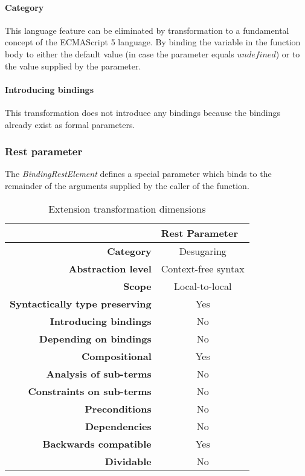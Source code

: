 \paragraph{Category}
This language feature can be eliminated by transformation to a fundamental concept of the ECMAScript 5 language. By binding the variable in the function body to either the default value (in case the parameter equals $undefined$) or to the value supplied by the parameter.

\paragraph{Introducing bindings}
This transformation does not introduce any bindings because the bindings already exist as formal parameters.

\subsubsection{Rest parameter}
The \textit{BindingRestElement} defines a special parameter which binds to the remainder of the arguments supplied by the caller of the function.\cite[14.1]{SpecJS}

\begin{table}[h]
\centering
\caption{Extension transformation dimensions}
\label{rest-parameter-table}
\begin{tabular}{@{}rc@{}}
\toprule
                                       & \multicolumn{1}{l}{\textbf{Rest Parameter}} \\ \midrule
\textbf{Category}                      & Desugaring
\\
\textbf{Abstraction level}          & Context-free syntax                          \\
\textbf{Scope}                         & Local-to-local                               \\
\textbf{Syntactically type preserving} & Yes                                          \\
\textbf{Introducing bindings}          & No                                          \\%
\textbf{Depending on bindings}         & No                                           \\
\textbf{Compositional}                 & Yes                                          \\
\textbf{Analysis of sub-terms}          & No                                          \\
\textbf{Constraints on sub-terms}       & No                                           \\
\textbf{Preconditions}                 & No                                          \\
\textbf{Dependencies}                  & No                                           \\
\textbf{Backwards compatible}          & Yes                                          \\
\textbf{Dividable}                     & No                                           \\ \bottomrule
\end{tabular}
\end{table}

